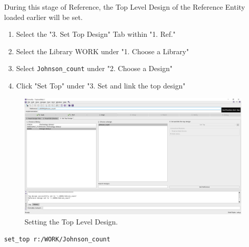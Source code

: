 \documentclass[a4paper,12pt,twoside]{article}
\begin{document}
\begin{enumerate}
    During this stage of Reference, the Top Level Design of the Reference Entity loaded earlier will be set.
    \begin{enumerate}
        \item Select the "3. Set Top Design" Tab within "1. Ref."
        \item Select the Library WORK under "1. Choose a Library"
        \item Select \texttt{Johnson\_count} under "2. Choose a Design"
        \item Click "Set Top" under "3. Set and link the top design"
    \end{enumerate}
    \begin{figure}[H]
        \centering
        \includegraphics[width=\textwidth]{images/44.png}
        \caption{Setting the Top Level Design.}
    \end{figure}
    \begin{verbatim}
set_top r:/WORK/Johnson_count
    \end{verbatim}
\end{enumerate}
\end{document}
